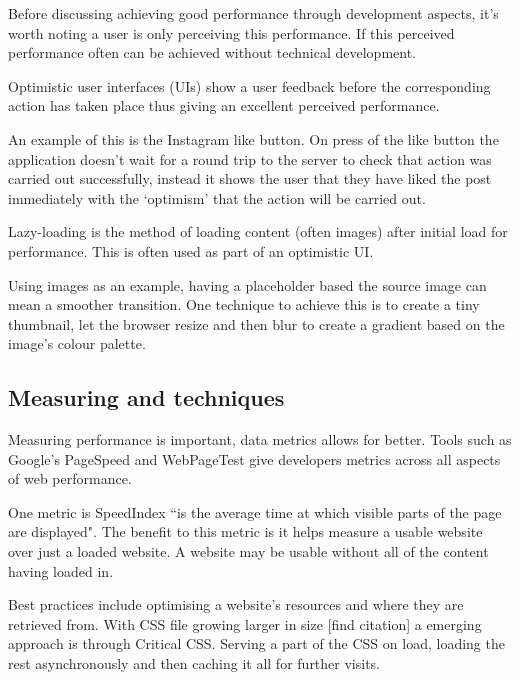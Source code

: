 Before discussing achieving good performance through development aspects, it's worth noting a user is only perceiving this performance. If this perceived performance often can be achieved without technical development.

Optimistic user interfaces (UIs) show a user feedback before the corresponding action has taken place thus giving an excellent perceived performance.

An example of this is the Instagram like button. On press of the like button the application doesn't wait for a round trip to the server to check that action was carried out successfully, instead it shows the user that they have liked the post immediately with the `optimism' that the action will be carried out. \cite{performing_actions_optimisitically}

Lazy-loading is the method of loading content (often images) after initial load for performance. This is often used as part of an optimistic UI.

Using images as an example, having a placeholder based the source image can mean a smoother transition. One technique to achieve this is to create a tiny thumbnail, let the browser resize and then blur to create a gradient based on the image's colour palette. \cite{image_colours_lazy_loading}


\subsection{Measuring and techniques} \label{l-r--measuring-and-techniques}

Measuring performance is important, data metrics allows for better. Tools such as Google's PageSpeed and WebPageTest give developers metrics across all aspects of web performance. %

One metric is SpeedIndex ``is the average time at which visible parts of the page are displayed". The benefit to this metric is it helps measure a usable website over just a loaded website. A website may be usable without all of the content having loaded in. \cite{speed_index}

Best practices include optimising a website's resources and where they are retrieved from. With CSS file growing larger in size [find citation] a emerging approach is through Critical CSS. Serving a part of the CSS on load, loading the rest asynchronously and then caching it all for further visits. \cite{fast_as_heck}

